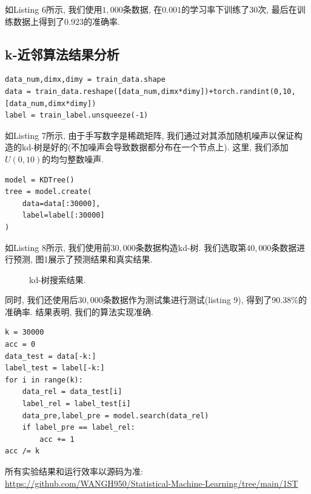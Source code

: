 如Listing 6所示, 我们使用$1,000$条数据, 在$0.001$的学习率下训练了$30$次, 最后在训练数据上得到了$0.923$的准确率.
\subsection{k-近邻算法结果分析}
\begin{lstlisting}[caption = MNIST数据预处理]
data_num,dimx,dimy = train_data.shape
data = train_data.reshape([data_num,dimx*dimy])+torch.randint(0,10,[data_num,dimx*dimy])
label = train_label.unsqueeze(-1)
\end{lstlisting}

如Listing 7所示, 由于手写数字是稀疏矩阵, 我们通过对其添加随机噪声以保证构造的kd-树是好的(不加噪声会导致数据都分布在一个节点上). 
这里, 我们添加$U(0,10)$的均匀整数噪声.
\begin{lstlisting}[caption = 构造kd-树]
model = KDTree()
tree = model.create(
    data=data[:30000],
    label=label[:30000]
)
\end{lstlisting}

如Listing 8所示, 我们使用前$30,000$条数据构造kd-树. 我们选取第$40,000$条数据进行预测, 图1展示了预测结果和真实结果.
\begin{figure}[htpb]
    \centering
    \caption{kd-树搜索结果.}
    \label{figure1}
\end{figure}

同时, 我们还使用后$30,000$条数据作为测试集进行测试(listing 9), 得到了$90.38\%$的准确率. 结果表明, 我们的算法实现准确.
\begin{lstlisting}[caption = 使用kd-树分类测试数据]
k = 30000
acc = 0
data_test = data[-k:]
label_test = label[-k:]
for i in range(k):
    data_rel = data_test[i]
    label_rel = label_test[i]
    data_pre,label_pre = model.search(data_rel)
    if label_pre == label_rel:
        acc += 1
acc /= k
\end{lstlisting}

所有实验结果和运行效率以源码为准: \\
\url{https://github.com/WANGH950/Statistical-Machine-Learning/tree/main/1ST }